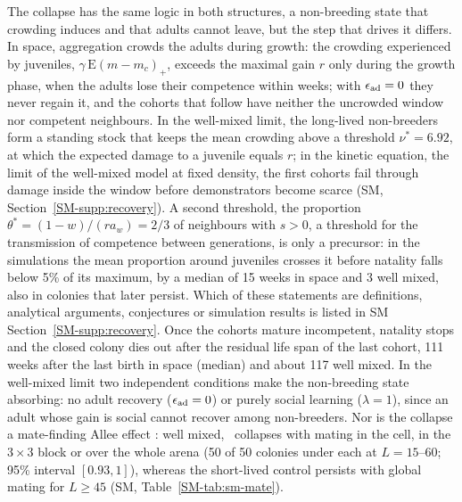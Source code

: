 The collapse has the same logic in both structures, a non-breeding state that crowding induces and that adults
cannot leave, but the step that drives it differs. In space, aggregation crowds the adults during growth: the
crowding experienced by juveniles, $\gamma\,\mathrm{E}(m-m_c)_+$, exceeds the maximal gain $r$ only during the growth
phase, when the adults lose their competence within weeks; with $\epsilon_{\rm ad}=0$ they never regain it, and the cohorts
that follow have neither the uncrowded window nor competent neighbours. In the well-mixed limit, the long-lived
non-breeders form a standing stock that keeps the mean crowding above a threshold $\nu^*=6.92$, at which the
expected damage to a juvenile equals $r$; in the kinetic equation, the limit of the well-mixed model at fixed
density, the first cohorts fail through damage inside the window before demonstrators become scarce (SM,
Section~\ref{SM-supp:recovery}). A second threshold, the proportion $\theta^*=(1-w)/(ra_w)=2/3$ of neighbours with
$s>0$, a threshold for the transmission of competence between generations, is only a precursor: in the
simulations the mean proportion around juveniles crosses it before natality falls below 5\% of its maximum, by a
median of 15 weeks in space and 3 well mixed, also in colonies that later persist. Which of these statements are
definitions, analytical arguments, conjectures or simulation results is listed in SM Section~\ref{SM-supp:recovery}. Once the
cohorts mature incompetent, natality stops and the closed colony dies out after the residual life span of the last
cohort, 111 weeks after the last birth in space (median) and about 117 well mixed. In the well-mixed limit two
independent conditions make the non-breeding state absorbing: no adult recovery ($\epsilon_{\rm ad}=0$) or purely social
learning ($\lambda=1$), since an adult whose gain is social cannot recover among non-breeders. Nor is the collapse a
mate-finding Allee effect \citep{Gascoigne2009}: well mixed, \Cone\ collapses with mating in the cell, in the
$3\times3$ block or over the whole arena (50 of 50 colonies under each at $L=15$--60; 95\% interval $[0.93,1]$),
whereas the short-lived control persists with global mating for $L\ge45$ (SM, Table~\ref{SM-tab:sm-mate}).
